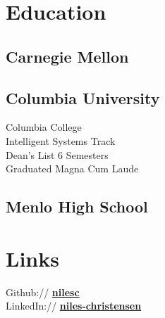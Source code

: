 \documentclass[letterpaper]{deedy-resume} %
\begin{document}
\begin{minipage}[t]{0.33\textwidth} %


\section{Education}

\subsection{Carnegie Mellon}


\sectionspace %
\subsection{Columbia University}
Columbia College \\
Intelligent Systems Track \\
Dean's List 6 Semesters\\
Graduated Magna Cum Laude\\

\sectionspace %


\subsection{Menlo High School}


\sectionspace %


\section{Links}

Github:// \href{https://github.com/nilesc}{\bf nilesc} \\
LinkedIn:// \href{https://www.linkedin.com/in/niles-christensen}{\bf niles-christensen} \\


\end{minipage}
\end{document}

